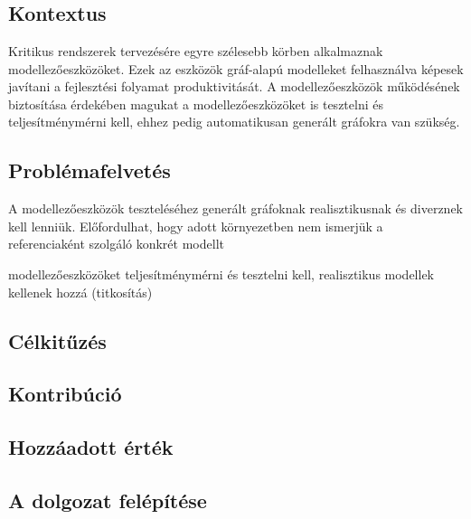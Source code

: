 \chapter{\bevezetes}

\section{Kontextus}
Kritikus rendszerek tervezésére egyre szélesebb körben alkalmaznak modellezőeszközöket.
Ezek az eszközök gráf-alapú modelleket felhasználva képesek javítani a fejlesztési folyamat produktivitását.
A modellezőeszközök működésének biztosítása érdekében magukat a modellezőeszközöket is tesztelni és teljesítménymérni kell, ehhez pedig automatikusan generált gráfokra van szükség.

\section{Problémafelvetés}
A modellezőeszközök teszteléséhez generált gráfoknak realisztikusnak és diverznek kell lenniük.
Előfordulhat, hogy adott környezetben nem ismerjük a referenciaként szolgáló konkrét modellt


modellezőeszközöket teljesítménymérni és tesztelni kell,
realisztikus modellek kellenek hozzá (titkosítás)

\section{Célkitűzés}

\section{Kontribúció}

\section{Hozzáadott érték}

\section{A dolgozat felépítése}





